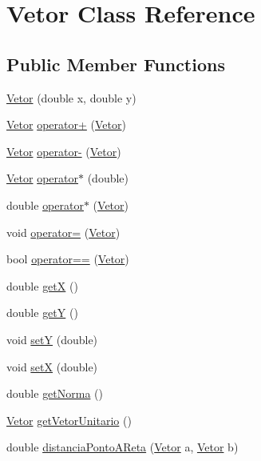 \hypertarget{class_vetor}{\section{\-Vetor \-Class \-Reference}
\label{class_vetor}
}
\subsection*{\-Public \-Member \-Functions}
\begin{DoxyCompactItemize}
\item 
\hyperlink{class_vetor_a96860c215bda4c360ecc4e9d4fc117b2}{\-Vetor} (double x, double y)
\item 
\hyperlink{class_vetor}{\-Vetor} \hyperlink{class_vetor_a58169b855673936bce05d95067b1bef1}{operator+} (\hyperlink{class_vetor}{\-Vetor})
\item 
\hyperlink{class_vetor}{\-Vetor} \hyperlink{class_vetor_ab814f53966625ab22821ff6f2f5a4d1c}{operator-\/} (\hyperlink{class_vetor}{\-Vetor})
\item 
\hyperlink{class_vetor}{\-Vetor} \hyperlink{class_vetor_a683b57df149b79773594458f4e4a9188}{operator$\ast$} (double)
\item 
double \hyperlink{class_vetor_ad38f456c8b902dc125269ae86fa5b36e}{operator$\ast$} (\hyperlink{class_vetor}{\-Vetor})
\item 
void \hyperlink{class_vetor_a69044c52a1f7820172e93d8d3f9cb15f}{operator=} (\hyperlink{class_vetor}{\-Vetor})
\item 
bool \hyperlink{class_vetor_ac4499f2c85a8823c868678cb6b219efb}{operator==} (\hyperlink{class_vetor}{\-Vetor})
\item 
double \hyperlink{class_vetor_a9f8dcfa551a53cce07373342bc9ec8c3}{get\-X} ()
\item 
double \hyperlink{class_vetor_ab5e48731d00fdedac420185453531e81}{get\-Y} ()
\item 
void \hyperlink{class_vetor_a403b16158cbc13da87d301c64097c0e0}{set\-Y} (double)
\item 
void \hyperlink{class_vetor_a68292db937545009a2cfc3187f3575b2}{set\-X} (double)
\item 
double \hyperlink{class_vetor_a6d7f1b6e44a489565d82fa15170053a8}{get\-Norma} ()
\item 
\hyperlink{class_vetor}{\-Vetor} \hyperlink{class_vetor_a72dc7c4f3d0e32c876b1708a5e09242f}{get\-Vetor\-Unitario} ()
\item 
double \hyperlink{class_vetor_a7ea3317d99d56fd6f6ce464efdc4b322}{distancia\-Ponto\-A\-Reta} (\hyperlink{class_vetor}{\-Vetor} a, \hyperlink{class_vetor}{\-Vetor} b)
\end{DoxyCompactItemize}


